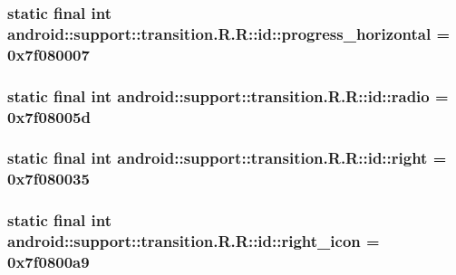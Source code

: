 \hypertarget{classandroid_1_1support_1_1transition_1_1_r_1_1id_9ea4cf4fed8898b0dc953ca52dbf6764}{
\subsubsection[{progress\_\-horizontal}]{\setlength{\rightskip}{0pt plus 5cm}static final int android::support::transition.R.R::id::progress\_\-horizontal = 0x7f080007}}
\label{classandroid_1_1support_1_1transition_1_1_r_1_1id_9ea4cf4fed8898b0dc953ca52dbf6764}


\hypertarget{classandroid_1_1support_1_1transition_1_1_r_1_1id_962304a380fc12b95adab6b012e5e580}{
\subsubsection[{radio}]{\setlength{\rightskip}{0pt plus 5cm}static final int android::support::transition.R.R::id::radio = 0x7f08005d}}
\label{classandroid_1_1support_1_1transition_1_1_r_1_1id_962304a380fc12b95adab6b012e5e580}


\hypertarget{classandroid_1_1support_1_1transition_1_1_r_1_1id_df25f33170451fc61b83a2e60515d9e7}{
\subsubsection[{right}]{\setlength{\rightskip}{0pt plus 5cm}static final int android::support::transition.R.R::id::right = 0x7f080035}}
\label{classandroid_1_1support_1_1transition_1_1_r_1_1id_df25f33170451fc61b83a2e60515d9e7}


\hypertarget{classandroid_1_1support_1_1transition_1_1_r_1_1id_fc96b4960e54db9fb6a5d97c0cb3d0c5}{
\subsubsection[{right\_\-icon}]{\setlength{\rightskip}{0pt plus 5cm}static final int android::support::transition.R.R::id::right\_\-icon = 0x7f0800a9}}
\label{classandroid_1_1support_1_1transition_1_1_r_1_1id_fc96b4960e54db9fb6a5d97c0cb3d0c5}


